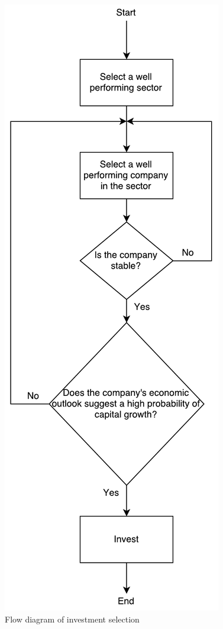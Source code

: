 \documentclass[letterpaper, 10 pt, conference]{ieeeconf}  %
\begin{document}
\begin{figure}
\centering
\includegraphics[scale=0.5]{decisions.pdf}
\caption{Flow diagram of investment selection}
\label{fig:flowChart}
\end{figure}

\label{sec:flowChart}




 
\end{document}
